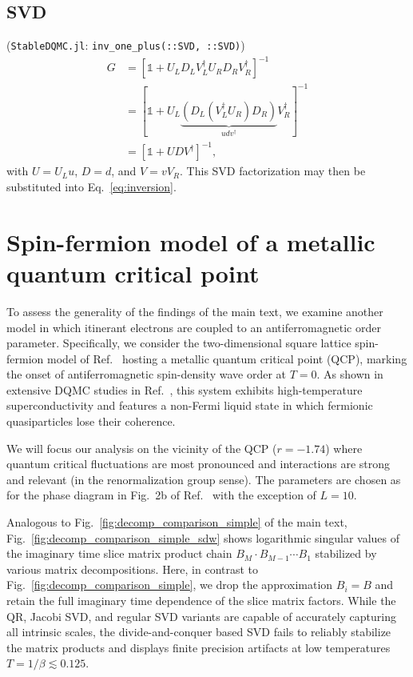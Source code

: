 \documentclass[submission, Phys]{SciPost}
\begin{document}
\begin{appendix}
\subsection{SVD}

(\texttt{StableDQMC.jl}: \texttt{inv\_one\_plus(::SVD, ::SVD)})
\begin{align}
G &= \left[\mathbb{1} + U_L D_L V_L^\dagger U_R D_R V_R^\dagger \right]^{-1} \nonumber \\
&= \left[\mathbb{1} + U_L \underbrace{\left( D_L \left( V_L^\dagger U_R \right) D_R \right)}_{udv^\dagger} V_R^\dagger \right]^{-1} \\
&= \left[\mathbb{1} + U D V^\dagger \right]^{-1},\nonumber
\end{align}
with $U=U_Lu$, $D=d$, and $V=v V_R$. This SVD factorization may then be substituted into Eq.~\eqref{eq:inversion}.



\section{Spin-fermion model of a metallic quantum critical point} \label{app:sdw}
To assess the generality of the findings of the main text, we examine another model in which itinerant electrons are coupled to an antiferromagnetic order parameter. Specifically, we consider the two-dimensional square lattice spin-fermion model of Ref.~\cite{Bauer2020} hosting a metallic quantum critical point (QCP), marking the onset of antiferromagnetic spin-density wave order at $T=0$. As shown in extensive DQMC studies in Ref.~\cite{Bauer2020}, this system exhibits high-temperature superconductivity and features a non-Fermi liquid state in which fermionic quasiparticles lose their coherence.

We will focus our analysis on the vicinity of the QCP ($r=-1.74$) where quantum critical fluctuations are most pronounced and interactions are strong and relevant (in the renormalization group sense). The parameters are chosen as for the phase diagram in Fig.~2b of Ref.~\cite{Bauer2020} with the exception of $L=10$.

Analogous to Fig.~\ref{fig:decomp_comparison_simple} of the main text, Fig.~\ref{fig:decomp_comparison_simple_sdw} shows logarithmic singular values of the imaginary time slice matrix product chain $B_M \cdot B_{M-1} \cdots B_1$ stabilized by various matrix decompositions. Here, in contrast to Fig.~\ref{fig:decomp_comparison_simple}, we drop the approximation $B_i = B$ and retain the full imaginary time dependence of the slice matrix factors. While the QR, Jacobi SVD, and regular SVD variants are capable of accurately capturing all intrinsic scales, the divide-and-conquer based SVD fails to reliably stabilize the matrix products and displays finite precision artifacts at low temperatures $T=1/\beta \lesssim 0.125$.


\end{appendix}
\end{document}
